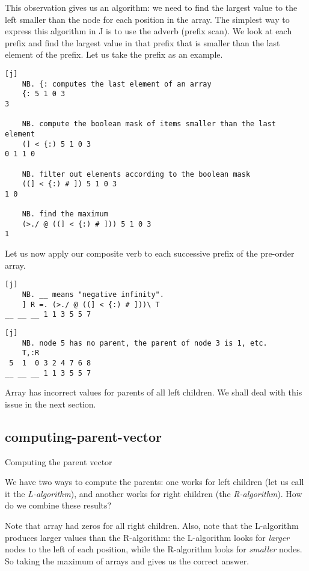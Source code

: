 \documentclass{article}
\begin{document}
This observation gives us an algorithm: we need to find the largest value to the left smaller than the node for each position in the array.
The simplest way to express this algorithm in J is to use the \href{https://code.jsoftware.com/wiki/Vocabulary/bslash}{\code{\}}} adverb (prefix scan).
We look at each prefix and find the largest value in that prefix that is smaller than the last element of the prefix.
Let us take the prefix  as an example.

\begin{verbatim}[j]
    NB. {: computes the last element of an array
    {: 5 1 0 3
3

    NB. compute the boolean mask of items smaller than the last element
    (] < {:) 5 1 0 3
0 1 1 0

    NB. filter out elements according to the boolean mask
    ((] < {:) # ]) 5 1 0 3
1 0

    NB. find the maximum
    (>./ @ ((] < {:) # ])) 5 1 0 3
1
\end{verbatim}

Let us now apply our composite verb to each successive prefix of the pre-order array.

\begin{verbatim}[j]
    NB. __ means "negative infinity".
    ] R =. (>./ @ ((] < {:) # ]))\ T
__ __ __ 1 1 3 5 5 7
\end{verbatim}

\begin{verbatim}[j]
    NB. node 5 has no parent, the parent of node 3 is 1, etc.
    T,:R
 5  1  0 3 2 4 7 6 8
__ __ __ 1 1 3 5 5 7
\end{verbatim}

Array  has incorrect values for parents of all left children.
We shall deal with this issue in the next section.

\subsection{computing-parent-vector}{Computing the parent vector}

We have two ways to compute the parents: one works for left children (let us call it the \emph{L-algorithm}), and another works for right children (the \emph{R-algorithm}).
How do we combine these results?

Note that array  had zeros for all right children. 
Also, note that the L-algorithm produces larger values than the R-algorithm: the L-algorithm looks for \emph{larger} nodes to the left of each position, while the R-algorithm looks for \emph{smaller} nodes.
So taking the maximum of arrays  and  gives us the correct answer.
\end{document}
